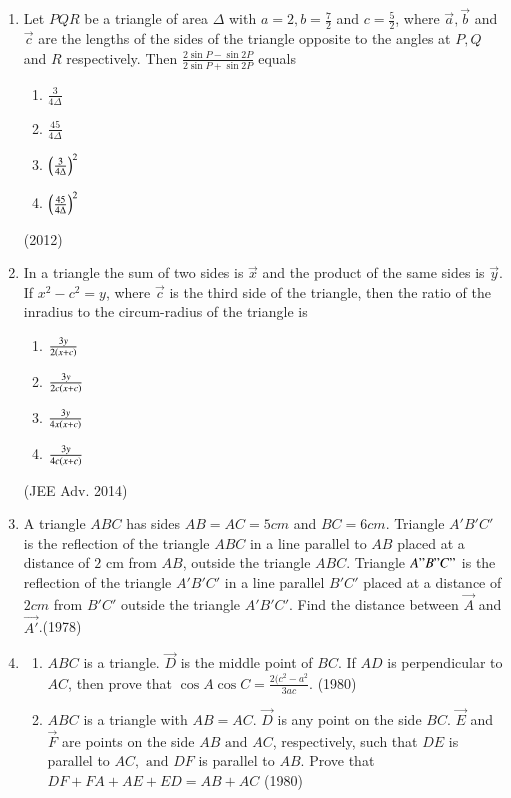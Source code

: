 \begin{enumerate}[label=\thesubsection.\arabic*,ref=\thesubsection.\theenumi]
\item Let $PQR$ be a triangle of area $\Delta$ with $a=2, b= \frac{7}{2}$ and $c=\frac{5}{2}$, where $\vec{a}, \vec{b}$ and $\vec{c}$ are the lengths of the sides of the triangle opposite to the angles at $P, Q$ and $R$ respectively. Then $\frac{2\sin P - \sin 2P}{2\sin P + \sin 2P}$ equals
\begin{enumerate}
\item $\frac{3}{4\Delta}$
\item $\frac{45}{4\Delta}$
\item $\left(\frac{3}{4\Delta}\right)^2$
\item $\left(\frac{45}{4\Delta}\right)^2$
\end{enumerate}
\hfill (2012)

\item In a triangle the sum of two sides is $\vec{x}$ and the product of the same sides is $\vec{y}$. If $x^2-c^2=y$, where $\vec{c}$ is the third side of the triangle, then the ratio of the inradius to the circum-radius of the triangle is
\begin{enumerate}
\item $\frac{3y}{2\left(x+c\right)}$
\item $\frac{3y}{2c\left(x+c\right)}$
\item $\frac{3y}{4x\left(x+c\right)}$
\item $\frac{3y}{4c\left(x+c\right)}$
\end{enumerate}
\hfill (JEE Adv. 2014)
     \item A triangle $ABC$ has sides $AB=AC=5 cm$ and $BC =6 cm$. Triangle $A'B'C'$ is the reflection of the triangle $ABC$ in a line parallel to $AB$ placed at a distance of $2$ cm from $AB$, outside the triangle $ABC$. Triangle $A"B"C"$ is the reflection of the triangle $A'B'C'$ in a line parallel $B'C'$ placed at a distance of $2 cm$ from $B'C'$ outside the triangle $A'B'C'$. Find the distance between $\vec{A}$ and $\vec{A'}$.\hfill {(1978)}
     \item 
     \begin{enumerate}
     \item $ABC$ is a triangle. $\vec{D}$ is the middle point of $BC$. If $AD$ is perpendicular to $AC$, then prove that $\cos{A}\cos{C} = \frac{2(c^{2}-a^{2}}{3ac}$.
     \hfill {(1980)}
     \item $ABC$ is a triangle with $AB=AC$. $\vec{D}$ is any point on the side $BC$. $\vec{E}$ and $\vec{F}$ are points on the side $AB \text{ and } AC$, respectively, such that $DE$ is parallel to $AC, \text{ and } DF$ is parallel to $AB$. Prove that \\
     $DF + FA + AE + ED = AB+AC$
     \hfill {(1980)} 


\end{enumerate}
\end{enumerate}
